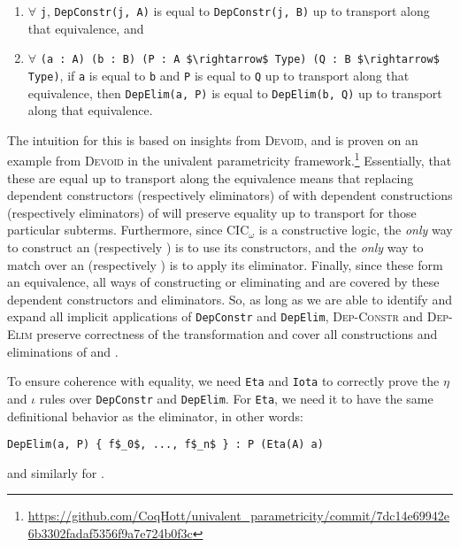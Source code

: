 \begin{enumerate} %
\item $\forall$ \lstinline{j}, \lstinline{DepConstr(j, A)} is equal to \lstinline{DepConstr(j, B)} up to transport along that equivalence, and
\item $\forall$ \lstinline{(a : A) (b : B) (P : A $\rightarrow$ Type) (Q : B $\rightarrow$ Type)}, if \lstinline{a} is equal to \lstinline{b} and \lstinline{P} is equal to \lstinline{Q} up to transport along that equivalence,
then \lstinline{DepElim(a, P)} is equal to \lstinline{DepElim(b, Q)} up to transport along that equivalence.
\end{enumerate}
The intuition for this is based on insights from \textsc{Devoid},
and is proven on an example from \textsc{Devoid} in the univalent parametricity framework.\footnote{\url{https://github.com/CoqHott/univalent_parametricity/commit/7dc14e69942e6b3302fadaf5356f9a7e724b0f3c}}
Essentially, that these are equal up to transport along the equivalence means that replacing dependent constructors (respectively eliminators) of \A
with dependent constructions (respectively eliminators) of \B will preserve equality up to transport for those particular subterms.
Furthermore, since CIC$_{\omega}$ is a constructive logic, the \textit{only} way to construct an \A (respectively \B) is to use its constructors,
and the \textit{only} way to match over an \A (respectively \B) is to apply its eliminator.
Finally, since these form an equivalence, all ways of constructing or eliminating \A and \B are covered by these dependent constructors and eliminators.
So, as long as we are able to identify and expand all implicit applications of \lstinline{DepConstr} and \lstinline{DepElim},
\textsc{Dep-Constr} and \textsc{Dep-Elim} preserve correctness of the transformation and cover all constructions and eliminations of \A and \B.

To ensure coherence with equality, we need \lstinline{Eta} and \lstinline{Iota} to correctly prove the $\eta$ and $\iota$ rules
over \lstinline{DepConstr} and \lstinline{DepElim}.
For \lstinline{Eta}, we need it to have the same definitional behavior as the
eliminator, in other words:

\begin{lstlisting}
DepElim(a, P) { f$_0$, ..., f$_n$ } : P (Eta(A) a)
\end{lstlisting}
and similarly for \B. %

